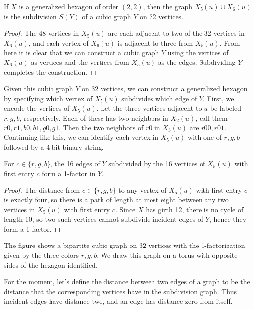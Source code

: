 \begin{theorem}
	If $X$ is a generalized hexagon of order $(2,2)$, then the graph $X_5(u)\cup X_6(u)$ is the subdivision $S(Y)$ of a cubic graph $Y$ on 32 vertices.
\end{theorem}  
\begin{proof}
	The 48 vertices in $X_5(u)$ are each adjacent to two of the 32 vertices in $X_6(u)$, and each vertex of $X_6(u)$ is adjacent to three from $X_5(u)$.  From here it is clear that we can construct a cubic graph $Y$ using the vertices of $X_6(u)$ as vertices and the vertices from $X_5(u)$ as the edges.  Subdividing $Y$ completes the construction.
\end{proof}



Given this cubic graph $Y$ on 32 vertices, we can construct a generalized hexagon by specifying which vertex of $X_5(u)$ subdivides which edge of $Y$.  First, we encode the vertices of $X_5(u)$.  Let the three vertices adjacent to $u$ be labeled $r,g,b$, respectively.  Each of these has two neighbors in $X_2(u)$, call them $r0,r1,b0,b1,g0,g1$.  Then the two neighbors of $r0$ in $X_3(u)$ are $r00,r01$.  Continuing like this, we can identify each vertex in $X_5(u)$ with one of $r,g,b$ followed by a 4-bit binary string.
\begin{lemma}
	For $c\in\{r,g,b\}$, the 16 edges of $Y$ subdivided by the 16 vertices of $X_5(u)$ with first entry $c$ form a 1-factor in $Y$.
\end{lemma}
\begin{proof}
	The distance from $c\in\{r,g,b\}$ to any vertex of $X_5(u)$ with first entry $c$ is exactly four, so there is a path of length at most eight between any two vertices in $X_5(u)$ with first entry $c$.  Since $X$ has girth 12, there is no cycle of length 10, so two such vertices cannot subdivide incident edges of $Y$, hence they form a 1-factor.
\end{proof}

The figure %
shows a bipartite cubic graph on 32 vertices with the 1-factorization given by the three colors $r,g,b$.  We draw this graph on a torus with opposite sides of the hexagon identified.

For the moment, let's define the distance between two edges of a graph to be the distance that the corresponding vertices have in the subdivision graph.  Thus incident edges have distance two, and an edge has distance zero from itself.

